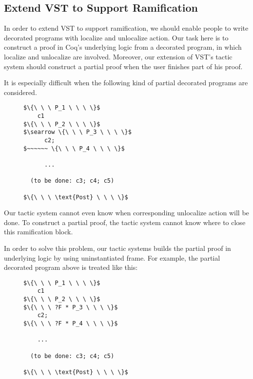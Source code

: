 \subsection{Extend VST to Support Ramification}

In order to extend VST to support ramification, we should enable people to write decorated programs with localize and unlocalize action. Our task here is to construct a proof in Coq's underlying logic from a decorated program, in which localize and unlocalize are involved. Moreover, our extension of VST's tactic system should construct a partial proof when the user finishes part of his proof.

It is especially difficult when the following kind of partial decorated programs are considered.

\begin{figure}[h]
\begin{lstlisting}
$\{\ \ \ P_1 \ \ \ \}$
    c1
$\{\ \ \ P_2 \ \ \ \}$
$\searrow \{\ \ \ P_3 \ \ \ \}$
      c2;
$~~~~~~ \{\ \ \ P_4 \ \ \ \}$

      ...

  (to be done: c3; c4; c5)

$\{\ \ \ \text{Post} \ \ \ \}$
\end{lstlisting}
\end{figure}

Our tactic system cannot even know when corresponding unlocalize action will be done. To construct a partial proof, the tactic system cannot know where to close this ramification block.

In order to solve this problem, our tactic systems builds the partial proof in underlying logic by using uninstantiated frame. For example, the partial decorated program above is treated like this:

\begin{figure}[h]
\begin{lstlisting}
$\{\ \ \ P_1 \ \ \ \}$
    c1
$\{\ \ \ P_2 \ \ \ \}$
$\{\ \ \ ?F * P_3 \ \ \ \}$
    c2;
$\{\ \ \ ?F * P_4 \ \ \ \}$

    ...

  (to be done: c3; c4; c5)

$\{\ \ \ \text{Post} \ \ \ \}$
\end{lstlisting}
\end{figure}







